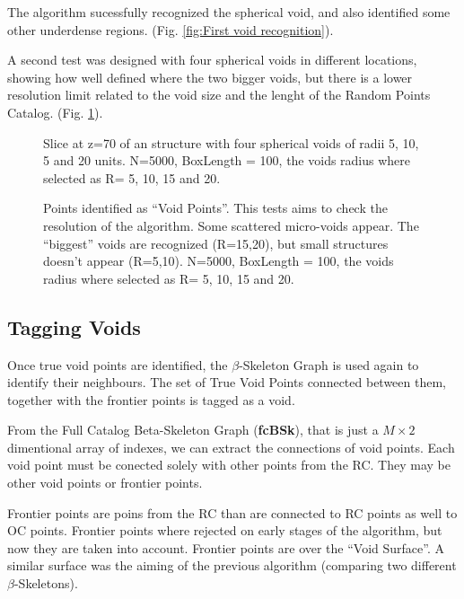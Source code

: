 \documentclass[preprint]{aastex62}
\begin{document}
The algorithm sucessfully recognized the spherical void, and also identified
some other underdense regions. (Fig. \ref{fig:First void recognition}).

A second test was designed with four spherical voids in different locations, showing
how well defined where the two bigger voids, but there is a lower resolution limit
related to the void size and the lenght of the Random Points Catalog.
(Fig. \ref{fig:slice for multiple spherical voids}).

\begin{figure}
  \caption{Slice at z=70 of an structure with four
    spherical voids of radii 5, 10, 5 and 20 units.
    N=5000, BoxLength = 100, the voids radius where selected as R= 5, 10, 15
    and 20.
    \label{fig:slice for multiple spherical voids}}
\end{figure}



\begin{figure}
  \caption{Points identified as ``Void Points''. This tests aims to check
    the resolution of the algorithm. Some scattered micro-voids appear.
    The ``biggest'' voids are recognized (R=15,20), but small structures doesn't
    appear (R=5,10).
    N=5000, BoxLength = 100, the voids radius where selected as R= 5, 10, 15
    and 20.
    \label{Testing multiple spherical voids}}
\end{figure}





\subsection{Tagging Voids}

Once true void points are identified, the $\beta$-Skeleton Graph is used
again to identify their neighbours. The set of True Void Points connected
between them, together with the frontier points is tagged as a void.

From the Full Catalog Beta-Skeleton Graph (\textbf{fcBSk}), that is just a
$M \times2$ dimentional array of indexes,
we can extract the connections of void points. Each void point
must be conected solely with other points from the RC. They may be other
void points or frontier points.

Frontier points are poins from the RC than
are connected to RC points as well to OC points. Frontier points where
rejected on early stages of the algorithm, but now they are taken into account.
Frontier points are over the ``Void Surface''. A similar surface was the aiming
of the previous algorithm (comparing two different $\beta$-Skeletons).
\end{document}
